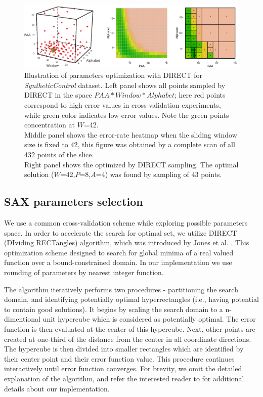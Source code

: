 \documentclass{llncs}
\newcommand{\myfigureshrinker}{\vspace{-1cm}}
\begin{document}
\begin{figure}[t]
   \myfigureshrinker
   \centering
   \includegraphics[width=115mm]{figures/figure_direct.eps}
   \caption{Illustration of parameters optimization with DIRECT 
   for \textit{SyntheticControl} dataset. 
   Left panel shows all points sampled by DIRECT in the space $PAA*Window*Alphabet$; here
   red points correspond to high error values in cross-validation experiments, while green color 
   indicates low error values. Note the green points concentration at $W$=42.\\ 
   Middle panel shows the error-rate heatmap when the sliding window size is fixed to 42, 
   this figure was obtained by a complete scan of all 432 points of the slice.\\ 
   Right panel shows the optimized by DIRECT sampling. The optimal solution 
   ($W$=42,$P$=8,$A$=4) was found by sampling of 43 points.}
   \label{fig:direct-sampling}
\end{figure}

\subsection{SAX parameters selection} \label{section-direct}
We use a common cross-validation scheme while exploring possible parameters space. 
In order to accelerate the search for optimal set, 
we utilize DIRECT (DIviding RECTangles) algorithm, which 
was introduced by Jones et al. \cite{direct-original}. This optimization scheme 
designed to search for global minima of a real valued function over a bound-constrained domain. 
In our implementation we use rounding of parameters by nearest integer function.

The algorithm iteratively performs two procedures - partitioning the search domain, 
and identifying potentially optimal hyperrectangles (i.e., having potential to contain good
solutions). 
It begins by scaling the search domain to a n-dimentional unit hypercube which is considered 
as potentially optimal. The error function is then evaluated at the center of this hypercube. Next, 
other points are created at one-third of the distance from the center in all coordinate directions. 
The hypercube is then divided into smaller rectangles which are identified by their center point 
and their error function value. This procedure continues interactively until error function
converges.
For brevity, we omit the detailed explanation of the algorithm, and refer the 
interested reader to \cite{direct} for additional details about our implementation.
\end{document}
